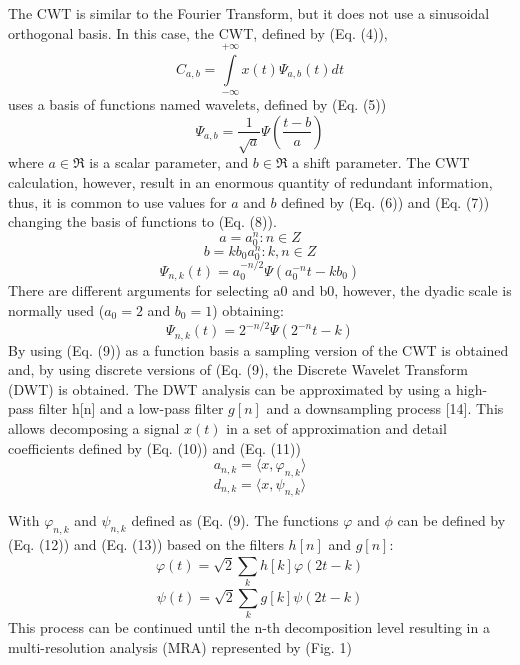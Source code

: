 \documentclass[12pt, a4paper]{article}
\begin{document}
The CWT is similar to the Fourier Transform, but it does not use a sinusoidal orthogonal basis. In this case, the CWT, defined by (Eq. (4)),
\begin{equation}
C_{a,b} = \int\limits_{-\infty}^{+\infty} x(t) \Psi_{a,b}(t) dt
\end{equation}
uses a basis of functions named wavelets, defined by (Eq. (5))
\begin{equation}
\Psi_{a,b} = \frac{1}{\sqrt{a}} \Psi(\frac{t-b}{a})
\end{equation}
where $ a \in \Re $ is a scalar parameter, and $ b \in \Re $ a shift parameter. The CWT calculation, however, result in an enormous quantity of redundant information, thus, it is common to use values for $a$ and $b$ defined by (Eq. (6)) and (Eq. (7)) changing the basis of functions to (Eq. (8)).
\begin{equation}
a = a_{0}^{n} : n \in Z
\end{equation}
\begin{equation}
b = k b_{0} a_{0}^{n} : k, n \in Z
\end{equation}
\begin{equation}
\Psi_{n, k}(t) = a_{0}^{-n/2} \Psi(a_{0}^{-n} t - k b_0)
\end{equation}
There are different arguments for selecting a0 and b0, however, the dyadic scale is normally used ($a_0=2$ and $b_0=1$) obtaining:
\begin{equation}
\Psi_{n, k}(t) = 2^{-n/2} \Psi(2^{-n}t-k)
\end{equation}
By using (Eq. (9)) as a function basis a sampling version of the CWT is obtained and, by using discrete versions of (Eq. (9), the Discrete Wavelet Transform (DWT) is obtained.  The DWT analysis can be approximated by using a high-pass filter h[n] and a low-pass filter $g[n]$ and a downsampling process [14]. This allows decomposing a signal $x(t)$ in a set of approximation and detail coefficients defined by (Eq. (10)) and (Eq. (11))
\begin{equation}
a_{n,k} = \langle x, \varphi_{n,k} \rangle
\end{equation}
\begin{equation}
d_{n,k} = \langle x, \psi_{n,k} \rangle
\end{equation}

With $ \varphi_{n,k} $ and $ \psi_{n,k} $ defined as (Eq. (9). The functions $\varphi$ and $\phi$ can be defined by (Eq. (12)) and (Eq. (13)) based on the filters $h[n]$ and $g[n]$:
\begin{equation}
\varphi(t) = \sqrt{2} \sum\limits_{k}^{} h[k] \varphi(2t-k)
\end{equation}
\begin{equation}
\psi(t) = \sqrt{2} \sum\limits_{k}^{} g[k] \psi(2t-k)
\end{equation}
This process can be continued until the n-th decomposition level resulting in a multi-resolution analysis (MRA) represented by (Fig. 1)
\end{document}
